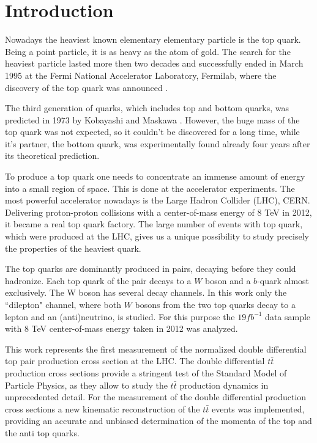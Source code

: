 \chapter{Introduction}

Nowadays the heaviest known elementary elementary particle is the top quark. 
Being a point particle, it is as heavy as the atom of gold. 
The search for the heaviest particle lasted more then two decades and successfully 
ended in March 1995 at the Fermi National Accelerator Laboratory, Fermilab, where 
the discovery of the top quark was announced \cite{PhysRevLett.74.2626}. 

The third generation of quarks, which includes top and bottom quarks, 
was predicted in 1973 by Kobayashi and Maskawa \cite{Kobayashi:1973fv}. However, the huge mass of the 
top quark was not expected, so it couldn't be discovered for a long time, while it's partner, 
the bottom quark, was experimentally found already four years after its theoretical prediction. 

To produce a top quark one needs to concentrate an immense amount of energy 
into a small region of space. This is done at the accelerator experiments. 
The most powerful accelerator nowadays is the Large Hadron Collider (LHC), CERN. 
Delivering proton-proton collisions with a center-of-mass energy of 8 TeV in 2012, 
it became a real top quark factory. The large number of events with top quark, 
which were produced at the LHC, gives us a unique possibility to study precisely the properties of the heaviest quark. 

The top quarks are dominantly produced in pairs, decaying before they could hadronize. 
Each top quark of the pair decays to a $W$ boson and a $b$-quark almost exclusively. 
The W boson has several decay channels. In this work only the ``dilepton" channel, 
where both $W$ bosons from the two top quarks decay to a lepton and an (anti)neutrino, is studied. 
For this purpose the $19 fb^{-1}$ data sample with 8 TeV center-of-mass energy taken in 2012 was analyzed.

This work represents the first measurement of the normalized double differential top pair production
cross section at the LHC. The double differential $t\bar{t}$ production cross sections provide a stringent test of the 
Standard Model of Particle Physics, as they allow to study the $t\bar{t}$ production dynamics in unprecedented
detail. For the measurement of the double differential production cross sections a new kinematic reconstruction
of the $t\bar{t}$ events was implemented, providing an accurate and unbiased determination of the momenta of the
top and the anti top quarks.

